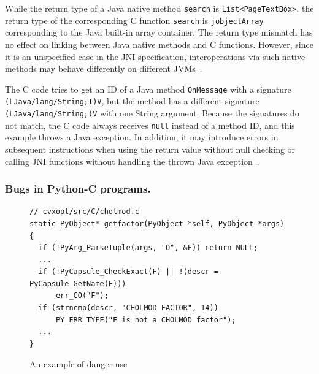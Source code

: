 While the return type of a Java native method {\tt search}
is {\tt List<PageTextBox>}, the return type of the corresponding C function
{\tt search} is {\tt jobjectArray} corresponding to the Java built-in array
container. The return type mismatch has no effect on linking between
Java native methods and C functions. However, since it is an unspecified case in
the JNI specification, interoperations via such native methods may behave
differently on different JVMs~\cite{LeeASE20}. 


The C code tries to get an ID of a Java method {\tt OnMessage} with a
signature \texttt{(LJava/lang/String;I)V}, but the method has a different
signature \texttt{(LJava/lang/String;)V} with one String argument. Because
the signatures do not match, the C code always receives {\tt null}
instead of a method ID, and this example throws a Java exception. In
addition, it may introduce errors in subsequent instructions when using the
return value without null checking or calling JNI functions without handling the
thrown Java exception~\cite{jniexcept}.


\subsubsection{Bugs in Python-C programs.}



\begin{figure}[ht!]
  \centering
  \vspace{2mm}
  \begin{lstlisting}[style=cpp,xleftmargin=2.5em]
// cvxopt/src/C/cholmod.c
static PyObject* getfactor(PyObject *self, PyObject *args)
{
  if (!PyArg_ParseTuple(args, "O", &F)) return NULL;
  ...
  if (!PyCapsule_CheckExact(F) || !(descr = PyCapsule_GetName(F)))
      err_CO("F");
  if (strncmp(descr, "CHOLMOD FACTOR", 14))
      PY_ERR_TYPE("F is not a CHOLMOD factor");
  ...
}
  \end{lstlisting}
    \vspace*{-.5em}
  \caption{An example of danger-use}
  \label{fig:cvxopt}
\end{figure}

